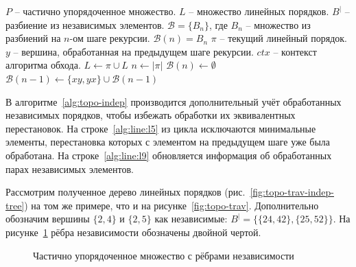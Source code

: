 \begin{algorithm}[H]
  \caption{Обход частично упорядоченного множества с учётом
  независимости пар операций}
  \label{alg:topo-indep}
  \begin{algorithmic}[1]
    \Require $P$ -- частично упорядоченное множество.
    \Require $L$ -- множество линейных порядков.
    \Require $B^{|}$ -- разбиение из независимых элементов.
    \Require $\mathcal{B} = \{B_n\}$, где $B_n$ -- множество из
    разбиений на $n$-ом шаге рекурсии. $\mathcal{B}(n) = B_n$
    \Require $\pi$ -- текущий линейный порядок.
    \Require $y$ -- вершина, обработанная на предыдущем шаге рекурсии.
    \Require $ctx$ -- контекст алгоритма обхода.
    \State $L \gets \pi \cup L$ 
    \State \Return
    \EndIf
    \State $n \gets |\pi|$
    \State $\mathcal{B}(n) \gets \emptyset$
     \label{alg:line:l5}
    \State {} 
    \State {}
    \State $\mathcal{B}(n-1) \gets \{xy, yx\} \cup \mathcal{B}(n-1)$
    \label{alg:line:l9}
    \EndIf
    \EndFor
    \EndFunction
  \end{algorithmic}
\end{algorithm}

В алгоритме~\ref{alg:topo-indep} производится дополнительный учёт
обработанных независимых порядков, чтобы избежать обработки их
эквивалентных перестановок. На строке~\ref{alg:line:l5} из
цикла исключаются
минимальные элементы, перестановка которых с элементом на предыдущем
шаге уже была обработана. На строке~\ref{alg:line:l9} обновляется
информация об
обработанных парах независимых элементов.

Рассмотрим полученное дерево линейных порядков
(рис.~\ref{fig:topo-trav-indep-tree}) на том же примере, что и на
рисунке~\ref{fig:topo-trav}. Дополнительно обозначим вершины $\{2,
4\}$ и $\{2, 5\}$ как независимые: $B^| = \{\{24, 42\}, \{25,
52\}\}$. На рисунке~\ref{fig:topo-indep-poset} рёбра независимости
обозначены двойной чертой.

\begin{figure}[htbp]
  \centerfloat{
    
  }
  \caption{Частично упорядоченное множество с рёбрами независимости}
  \label{fig:topo-indep-poset}
\end{figure}

